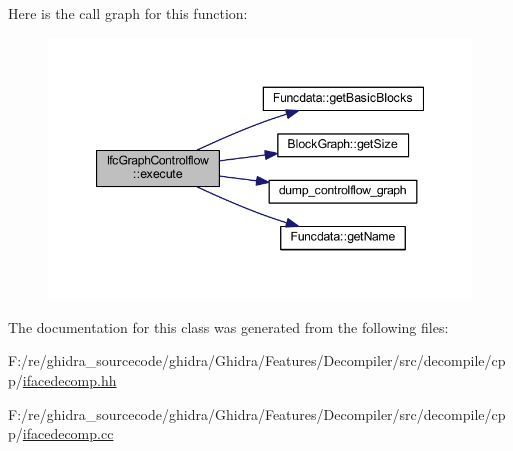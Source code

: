 Here is the call graph for this function\+:
\nopagebreak
\begin{figure}[H]
\begin{center}
\leavevmode
\includegraphics[width=347pt]{class_ifc_graph_controlflow_aba87e4fc25a1fda8d53591f3781ec32e_cgraph}
\end{center}
\end{figure}


The documentation for this class was generated from the following files\+:\begin{DoxyCompactItemize}
\item 
F\+:/re/ghidra\+\_\+sourcecode/ghidra/\+Ghidra/\+Features/\+Decompiler/src/decompile/cpp/\mbox{\hyperlink{ifacedecomp_8hh}{ifacedecomp.\+hh}}\item 
F\+:/re/ghidra\+\_\+sourcecode/ghidra/\+Ghidra/\+Features/\+Decompiler/src/decompile/cpp/\mbox{\hyperlink{ifacedecomp_8cc}{ifacedecomp.\+cc}}\end{DoxyCompactItemize}
